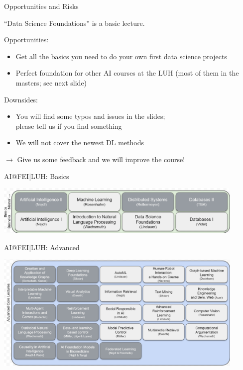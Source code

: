 \documentclass[aspectratio=169,handout]{../latex_main/tntbeamer}  %
\begin{document}
\begin{frame}[c]{Opportunities and Risks}

``Data Science Foundations'' is a basic lecture.

\bigskip
\pause

Opportunities:
\begin{itemize}
  \item Get all the basics you need to do your own first data science projects
  \item Perfect foundation for other AI courses at the LUH (most of them in the masters; see next slide)
\end{itemize}

\medskip

Downsides:
\begin{itemize}
  \item You will find some typos and issues in the slides;\\ please tell us if you find something
  \item We will not cover the newest DL methods
\end{itemize}

\medskip
$\to$ Give us some feedback and we will improve the course!

\end{frame}
\begin{frame}[c]{AI@FEI|LUH: Basics}

\vspace{-2em}
\centering
\includegraphics[width=0.9\textwidth]{figures/ai_basics}

\end{frame}
\begin{frame}[c]{AI@FEI|LUH: Advanced}

\vspace{-2em}
\centering
\includegraphics[width=0.9\textwidth]{figures/ai_adv}

\end{frame}
\end{document}
